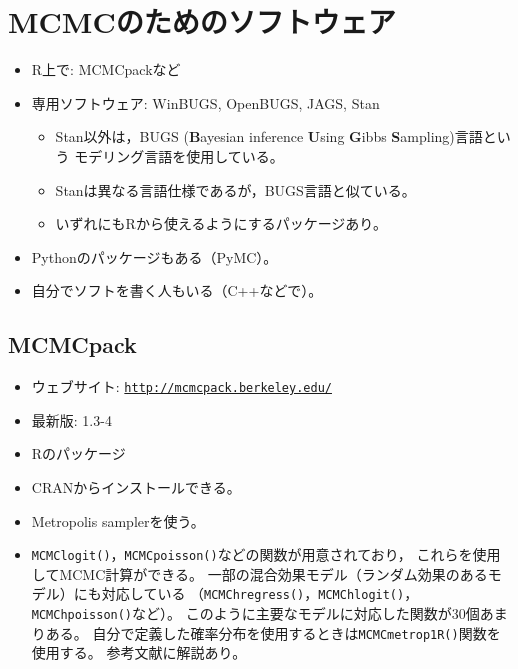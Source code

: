 \documentclass[11pt,uplatex]{jsarticle}
\begin{document}
\section{MCMCのためのソフトウェア}
\begin{itemize}
\item  \textsf{R}上で: MCMCpackなど
\item 専用ソフトウェア: \textsf{WinBUGS}, \textsf{OpenBUGS}, \textsf{JAGS}, \textsf{Stan}
\begin{itemize}
 \item  \textsf{Stan}以外は，BUGS (\textbf{B}ayesian inference \textbf{U}sing
 \textbf{G}ibbs \textbf{S}ampling)言語\cite{BUGSBook, BUGS}という
 モデリング言語を使用している。
 \label{BUGS}
\item \textsf{Stan}は異なる言語仕様であるが，BUGS言語と似ている。
\item  いずれにも\textsf{R}から使えるようにするパッケージあり。
\end{itemize}
\item \textsf{Python}のパッケージもある（\textsf{PyMC}）。
\item 自分でソフトを書く人もいる（C++などで）。
\end{itemize}

\subsection{MCMCpack}

\begin{itemize}
\item ウェブサイト: \texttt{\url{http://mcmcpack.berkeley.edu/}}
\item 最新版: 1.3-4
\item \textsf{R}のパッケージ
\item CRANからインストールできる。
\item Metropolis samplerを使う。
\item \texttt{MCMClogit()}，\texttt{MCMCpoisson()}などの関数が用意されており，
これらを使用してMCMC計算ができる。
一部の混合効果モデル（ランダム効果のあるモデル）にも対応している
（\texttt{MCMChregress()}，\texttt{MCMChlogit()}，
\texttt{MCMChpoisson()}など）。
このように主要なモデルに対応した関数が30個あまりある。
自分で定義した確率分布を使用するときは\texttt{MCMCmetrop1R()}関数を使用する。
参考文献\cite{MCMCpack}に解説あり。
\end{itemize}
\end{document}
